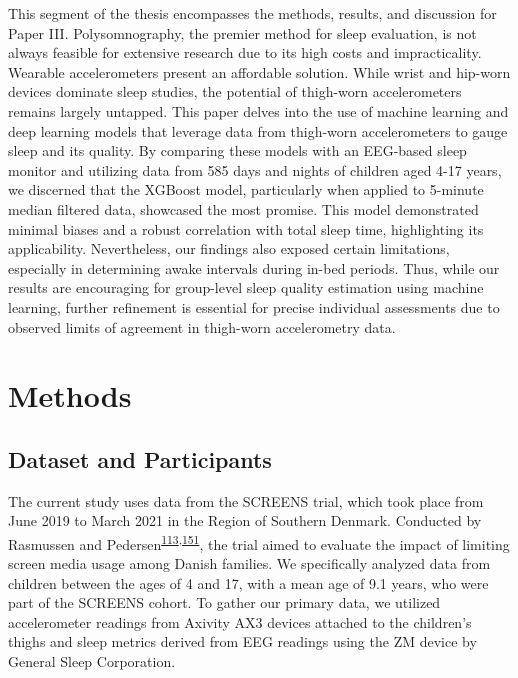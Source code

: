 \documentclass[
  10pt,
]{scrbook}
\begin{document}
This segment of the thesis encompasses the methods, results, and
discussion for Paper III. Polysomnography, the premier method for sleep
evaluation, is not always feasible for extensive research due to its
high costs and impracticality. Wearable accelerometers present an
affordable solution. While wrist and hip-worn devices dominate sleep
studies, the potential of thigh-worn accelerometers remains largely
untapped. This paper delves into the use of machine learning and deep
learning models that leverage data from thigh-worn accelerometers to
gauge sleep and its quality. By comparing these models with an EEG-based
sleep monitor and utilizing data from 585 days and nights of children
aged 4-17 years, we discerned that the XGBoost model, particularly when
applied to 5-minute median filtered data, showcased the most promise.
This model demonstrated minimal biases and a robust correlation with
total sleep time, highlighting its applicability. Nevertheless, our
findings also exposed certain limitations, especially in determining
awake intervals during in-bed periods. Thus, while our results are
encouraging for group-level sleep quality estimation using machine
learning, further refinement is essential for precise individual
assessments due to observed limits of agreement in thigh-worn
accelerometry data.

\hypertarget{methods-2}{%
\section{Methods}\label{methods-2}}

\hypertarget{dataset-and-participants}{%
\subsection{Dataset and Participants}\label{dataset-and-participants}}

The current study uses data from the SCREENS trial, which took place
from June 2019 to March 2021 in the Region of Southern Denmark.
Conducted by Rasmussen and
Pedersen\textsuperscript{\protect\hyperlink{ref-rasmussen_short-term_2020}{113},\protect\hyperlink{ref-pedersen_effects_2022}{151}},
the trial aimed to evaluate the impact of limiting screen media usage
among Danish families. We specifically analyzed data from children
between the ages of 4 and 17, with a mean age of 9.1 years, who were
part of the SCREENS cohort. To gather our primary data, we utilized
accelerometer readings from Axivity AX3 devices attached to the
children's thighs and sleep metrics derived from EEG readings using the
ZM device by General Sleep Corporation.
\end{document}

